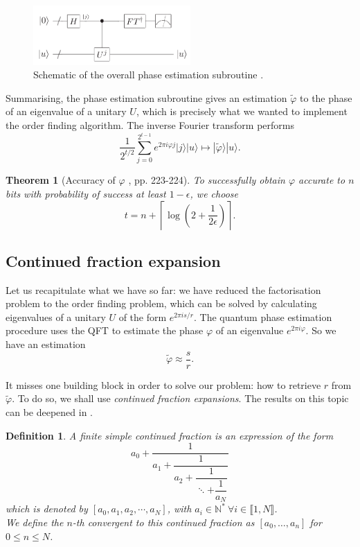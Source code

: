 \documentclass[a4paper, 10pt]{article}
\newtheorem{theorem}{Theorem }[section]
\newtheorem{definition}{Definition }[section]
\numberwithin{equation}{section}
\numberwithin{figure}{section}
\numberwithin{table}{section}
\begin{document}
\begin{figure}[h!]
	\centering
	\includegraphics[width=6cm]{Figures/phase-estimation-2}
	\caption{Schematic of the overall phase estimation subroutine \cite{nielsen} .}
\end{figure}

Summarising, the phase estimation subroutine gives an estimation $\tilde{\varphi}$ to the phase of an eigenvalue of a unitary $U$, which is precisely what we wanted to implement the order finding algorithm. The inverse Fourier transform performs
$$ \frac{1}{2^{t/2}}\sum_{j=0}^{2^{t-1}}e^{2\pi i\varphi j}|j\rangle|u\rangle \mapsto |\tilde{\varphi}\rangle|u\rangle. $$

\begin{theorem}[Accuracy of $\varphi$ \cite{nielsen}, pp. 223-224]
	To successfully obtain $\varphi$ accurate to $n$ bits with probability of success at least $1-\epsilon$, we choose
	\begin{equation}
		t = n + \left\lceil \log\left(2+\frac{1}{2\epsilon}\right) \right\rceil.
	\end{equation}
\end{theorem}

\subsection{Continued fraction expansion}

Let us recapitulate what we have so far: we have reduced the factorisation problem to the order finding problem, which can be solved by calculating eigenvalues of a unitary $U$ of the form $e^{2\pi is/r}$. The quantum phase estimation procedure uses the QFT to estimate the phase $\varphi$ of an eigenvalue $e^{2\pi i\varphi}$. So we have an estimation
$$ \tilde{\varphi} \approx \frac{s}{r}. $$

It misses one building block in order to solve our problem: how to retrieve $r$ from $\tilde{\varphi}$. To do so, we shall use \textit{continued fraction expansions}. The results on this topic can be deepened in \cite{hardy}. 

\begin{definition}
	A finite simple continued fraction is an expression of the form
	\begin{equation}
		a_0 + \dfrac{1}{a_1 + \dfrac{1}{a_2 + \dfrac{1}{\ddots+\dfrac{1}{a_N}}}}
	\end{equation}
	which is denoted by $[a_0,  a_1, a_2, \cdots, a_N]$, with $a_i \in \mathbb{N}^*\ \forall i\in \llbracket 1, N\rrbracket$.\\
	We define the $n$-th convergent to this continued fraction as $[a_0,\dots,a_n]$ for $0\le n \le N$.
\end{definition}
\end{document}
